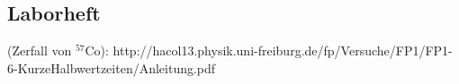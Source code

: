 \documentclass[12pt]{article}
\begin{document}
%

\newpage
\subsection{Laborheft}

\newpage
\listoffigures


\newpage
\thispagestyle{empty}
\begin{thebibliography}{9}

 (Zerfall von $^{57}$Co): http://hacol13.physik.uni-freiburg.de/fp/Versuche/FP1/FP1-6-KurzeHalbwertzeiten/Anleitung.pdf
  

  
  

\end{thebibliography}
\end{document}
